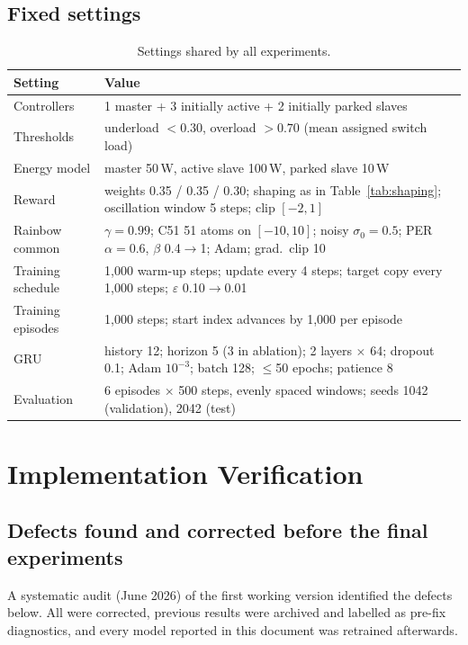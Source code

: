 \section{Fixed settings}

\begin{table}[H]
\centering
\caption{Settings shared by all experiments.}
\label{tab:app-fixed}
\small
\begin{tabularx}{\textwidth}{@{}p{5.2cm}L@{}}
\toprule
\textbf{Setting} & \textbf{Value}\\
\midrule
Controllers & 1 master + 3 initially active + 2 initially parked slaves\\
Thresholds & underload $<0.30$, overload $>0.70$ (mean assigned switch load)\\
Energy model & master 50\,W, active slave 100\,W, parked slave 10\,W\\
Reward & weights 0.35 / 0.35 / 0.30; shaping as in Table~\ref{tab:shaping}; oscillation window 5 steps; clip $[-2,1]$\\
Rainbow common & $\gamma=0.99$; C51 51 atoms on $[-10,10]$; noisy $\sigma_0=0.5$; PER $\alpha=0.6$, $\beta$ 0.4$\rightarrow$1; Adam; grad.\ clip 10\\
Training schedule & 1,000 warm-up steps; update every 4 steps; target copy every 1,000 steps; $\varepsilon$ 0.10$\rightarrow$0.01\\
Training episodes & 1,000 steps; start index advances by 1,000 per episode\\
GRU & history 12; horizon 5 (3 in ablation); 2 layers $\times$ 64; dropout 0.1; Adam $10^{-3}$; batch 128; $\le$50 epochs; patience 8\\
Evaluation & 6 episodes $\times$ 500 steps, evenly spaced windows; seeds 1042 (validation), 2042 (test)\\
\bottomrule
\end{tabularx}
\end{table}

\chapter{Implementation Verification}
\label{app:verification}

\section{Defects found and corrected before the final experiments}

A systematic audit (June 2026) of the first working version identified the defects below. All were corrected, previous results were archived and labelled as pre-fix diagnostics, and every model reported in this document was retrained afterwards.


